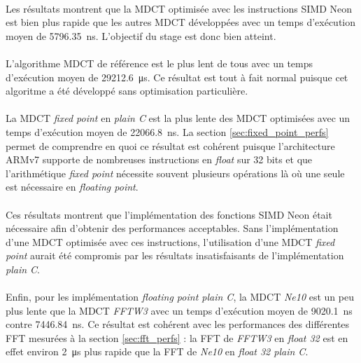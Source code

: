 \documentclass{article}
\begin{document}
    \paragraph{}
    Les résultats montrent que la MDCT optimisée avec les instructions SIMD Neon est bien plus rapide que les autres MDCT développées avec un temps d'exécution moyen de \SI{5796.35}{\nano\second}. L'objectif du stage est donc bien atteint.

    \paragraph{}
    L'algorithme MDCT de référence est le plus lent de tous avec un temps d'exécution moyen de \SI{29212.6}{\micro\second}. Ce résultat est tout à fait normal puisque cet algoritme a été développé sans optimisation particulière.

    \paragraph{}
    La MDCT \emph{fixed point} en \emph{plain C} est la plus lente des MDCT optimisées avec un temps d'exécution moyen de \SI{22066.8}{\nano\second}. La section \ref{sec:fixed_point_perfs} permet de comprendre en quoi ce résultat est cohérent puisque l'architecture ARMv7 supporte de nombreuses instructions en \emph{float} sur 32 bits et que l'arithmétique \emph{fixed point} nécessite souvent plusieurs opérations là où une seule est nécessaire en \emph{floating point}.

    \paragraph{}
    Ces résultats montrent que l'implémentation des fonctions SIMD Neon était nécessaire afin d'obtenir des performances acceptables. Sans l'implémentation d'une MDCT optimisée avec ces instructions, l'utilisation d'une MDCT \emph{fixed point} aurait été compromis par les résultats insatisfaisants de l'implémentation \emph{plain C}.

    \paragraph{}
    Enfin, pour les implémentation \emph{floating point plain C}, la MDCT \emph{Ne10} est un peu plus lente que la MDCT \emph{FFTW3} avec un temps d'exécution moyen de \SI{9020.1}{\nano\second} contre \SI{7446.84}{\nano\second}. Ce résultat est cohérent avec les performances des différentes FFT mesurées à la section \ref{sec:fft_perfs} : la FFT de \emph{FFTW3} en \emph{float 32} est en effet environ \SI{2}{\micro\second} plus rapide que la FFT de \emph{Ne10} en \emph{float 32 plain C}.
\end{document}
